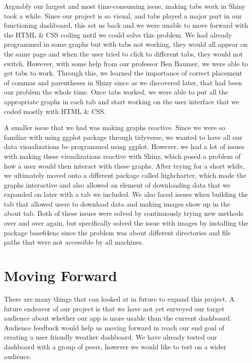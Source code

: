 \documentclass[10pt,letterpaper]{article}
\begin{document}
Arguably our largest and most time-consuming issue, making tabs work in
Shiny took a while. Since our project is so visual, and tabs played a
major part in our functioning dashboard, this set us back and we were
unable to move forward with the HTML \& CSS coding until we could solve
this problem. We had already programmed in some graphs but with tabs not
working, they would all appear on the same page and when the user tried
to click to different tabs, they would not switch. However, with some
help from our professor Ben Baumer, we were able to get tabs to work.
Through this, we learned the importance of correct placement of commas
and parentheses in Shiny since as we discovered later, that had been our
problem the whole time. Once tabs worked, we were able to put all the
appropriate graphs in each tab and start working on the user interface
that we coded mostly with HTML \& CSS.

A smaller issue that we had was making graphs reactive. Since we were so
familiar with using ggplot package through tidyverse, we wanted to have
all our data visualizations be programmed using ggplot. However, we had
a lot of issues with making these visualizations reactive with Shiny,
which posed a problem of how a user would then interact with these
graphs. After trying for a short while, we ultimately moved onto a
different package called highcharter, which made the graphs interactive
and also allowed an element of downloading data that we expanded on
later with a tab we included. We also faced issues when building the tab
that allowed users to download data and making images show up in the
about tab. Both of these issues were solved by continuously trying new
methods over and over again, but specifically solved the issue with
images by installing the package base64enc since the problem was about
different directories and file paths that were not accessible by all
machines.

\section{Moving Forward}\label{moving-forward}

There are many things that can looked at in future to expand this
project. A future endeavor of our project is that we have not yet
surveyed our target audience about whether our app is more usable than
the current dashboard. Audience feedback would help us moving forward in
reach our end goal of creating a user friendly weather dashboard. We
have already tested our dashboard with a group of peers, however we
would like to test on a wider audience.
\end{document}
